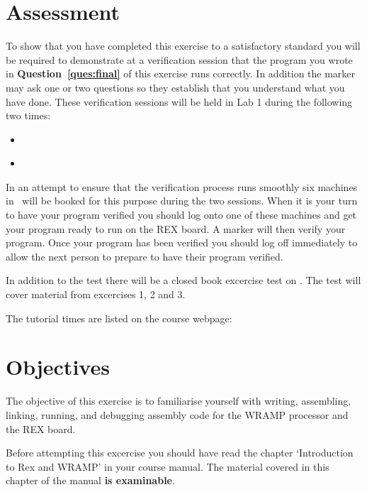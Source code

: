\documentclass[a4paper,10pt]{article}
\begin{document}


\section{Assessment}
To show that you have completed this exercise to a satisfactory
standard you will be required to demonstrate at a verification session
that the program you wrote in \textbf{Question~\ref{ques:final}} 
of this exercise
runs correctly. In addition the marker may ask one or two questions so
they establish that you understand what you have done.  These
verification sessions will be held in Lab 1 during the following two
times:

\begin{itemize}
\item \INTRODUE~\MORNINGASSESS
\item \INTRODUE~\AFTERNOONASSESS 
\end{itemize}

In an attempt to ensure that the verification process runs smoothly
six machines in \ASSESSROOM\ will be booked for this purpose during the two
sessions. When it is your turn to have your program verified you
should log onto one of these machines and get your program ready to
run on the REX board. A marker will then verify your program. Once
your program has been verified you should log off immediately to allow
the next person to prepare to have their program verified.

In addition to the test there will be a closed book excercise test on
\textbf{\CWRAMPTEST}.  The test will cover material 
from excercises 1, 2 and 3.

The tutorial times are listed on the course webpage:

\begin{center}
\src{\WEBPAGEBASE}
\end{center}

\section{Objectives}
The objective of this exercise is to familiarise 
yourself with writing, assembling, linking, running, and
debugging assembly code for the WRAMP processor and the REX board.

Before attempting this excercise you should have read the 
chapter `Introduction to Rex and WRAMP' in your course manual.  The material covered in this chapter of the manual \textbf{is examinable}.
\end{document}
